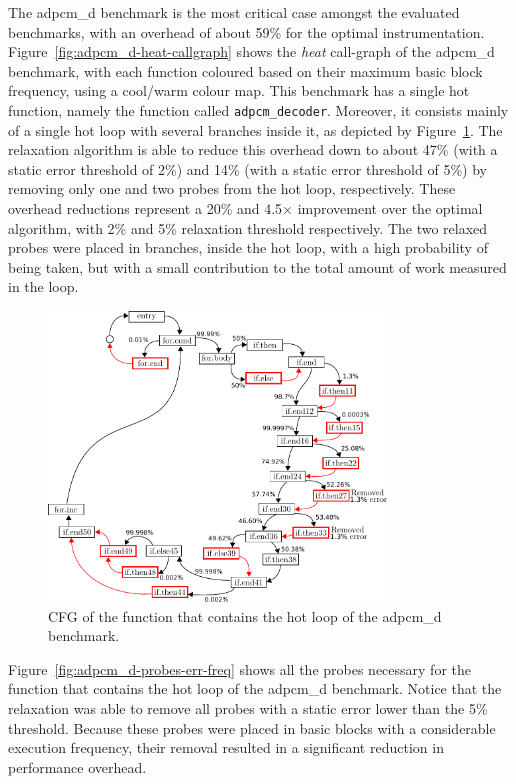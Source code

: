 The {\flagstype adpcm\_d} benchmark is the most critical case amongst the evaluated benchmarks, with an overhead of about 59\% for the optimal instrumentation.
Figure~\ref{fig:adpcm_d-heat-callgraph} shows the \textit{heat} call-graph of the {\flagstype adpcm\_d} benchmark, with each function coloured based on their maximum basic block frequency, using a cool/warm colour map.
This benchmark has a single hot function, namely the function called \verb|adpcm_decoder|.
Moreover, it consists mainly of a single hot loop with several branches inside it, as depicted by Figure~\ref{fig:adpcm_d-cfg-instr}.
The relaxation algorithm is able to reduce this overhead down to about 47\% (with a static error threshold of 2\%) and 14\% (with a static error threshold of 5\%) by removing only one and two probes from the hot loop, respectively.
These overhead reductions represent a 20\% and 4.5$\times$ improvement over the optimal algorithm, with 2\% and 5\% relaxation threshold respectively.
The two relaxed probes were placed in branches, inside the hot loop, with a high probability of being taken, but with a small contribution to the total amount of work measured in the loop.

\begin{figure}[H]
    \centering
    \includegraphics[width=0.8\textwidth]{figs/adpcm_d-cfg-instr.pdf}
    \caption{CFG of the function that contains the hot loop of the {\flagstype adpcm\_d} benchmark.}
    \label{fig:adpcm_d-cfg-instr}
\end{figure}

Figure~\ref{fig:adpcm_d-probes-err-freq} shows all the probes necessary for the function that contains the hot loop of the {\flagstype adpcm\_d} benchmark.
Notice that the relaxation was able to remove all probes with a static error lower than the 5\% threshold.
Because these probes were placed in basic blocks with a considerable execution frequency, their removal resulted in a significant reduction in performance overhead.

